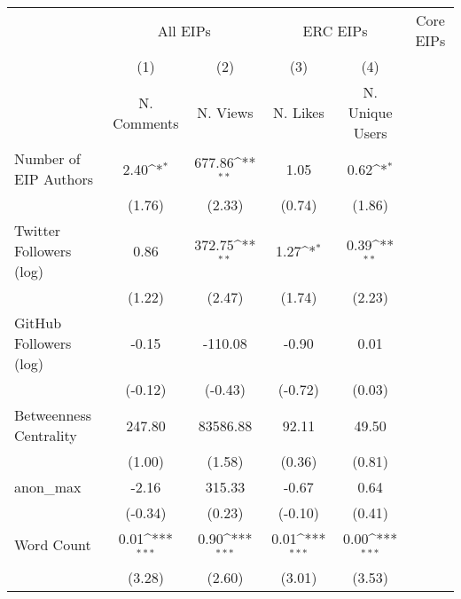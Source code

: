 {
\def\sym#1{\ifmmode^{#1}\else\(^{#1}\)\fi}
\begin{tabular}{l*{4}{c}}
\hline\hline
& \multicolumn{2}{c}{All EIPs} &  \multicolumn{2}{c}{ERC EIPs} &  \multicolumn{2}{c}{Core EIPs} \\ \cline{2-3}\cline{4-5}\cline{6-7}
                                   &\multicolumn{1}{c}{(1)}&\multicolumn{1}{c}{(2)}&\multicolumn{1}{c}{(3)}&\multicolumn{1}{c}{(4)}\\
                                   &\multicolumn{1}{c}{N. Comments}&\multicolumn{1}{c}{N. Views}&\multicolumn{1}{c}{N. Likes}&\multicolumn{1}{c}{N. Unique Users}\\
\hline
Number of EIP Authors              &        2.40\sym{*}  &      677.86\sym{**} &        1.05         &        0.62\sym{*}  \\
                                   &      (1.76)         &      (2.33)         &      (0.74)         &      (1.86)         \\
[1em]
Twitter Followers (log)            &        0.86         &      372.75\sym{**} &        1.27\sym{*}  &        0.39\sym{**} \\
                                   &      (1.22)         &      (2.47)         &      (1.74)         &      (2.23)         \\
[1em]
GitHub Followers (log)             &       -0.15         &     -110.08         &       -0.90         &        0.01         \\
                                   &     (-0.12)         &     (-0.43)         &     (-0.72)         &      (0.03)         \\
[1em]
Betweenness Centrality             &      247.80         &    83586.88         &       92.11         &       49.50         \\
                                   &      (1.00)         &      (1.58)         &      (0.36)         &      (0.81)         \\
[1em]
anon\_max                           &       -2.16         &      315.33         &       -0.67         &        0.64         \\
                                   &     (-0.34)         &      (0.23)         &     (-0.10)         &      (0.41)         \\
[1em]
Word Count                         &        0.01\sym{***}&        0.90\sym{***}&        0.01\sym{***}&        0.00\sym{***}\\
                                   &      (3.28)         &      (2.60)         &      (3.01)         &      (3.53)         \\

\end{tabular}}
